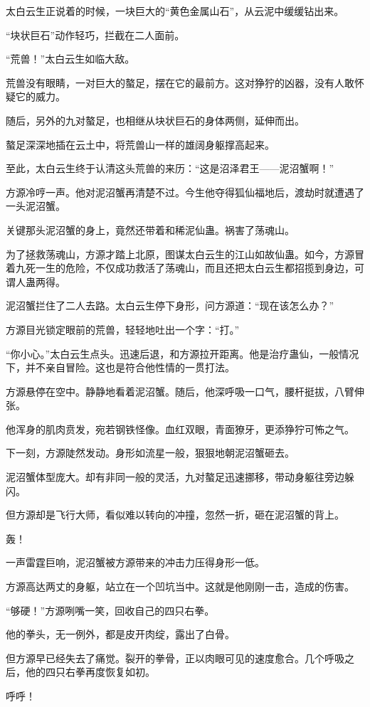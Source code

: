 \begin{this_body}
太白云生正说着的时候，一块巨大的“黄色金属山石”，从云泥中缓缓钻出来。

“块状巨石”动作轻巧，拦截在二人面前。

“荒兽！”太白云生如临大敌。

荒兽没有眼睛，一对巨大的螯足，摆在它的最前方。这对狰狞的凶器，没有人敢怀疑它的威力。

随后，另外的九对螯足，也相继从块状巨石的身体两侧，延伸而出。

螯足深深地插在云土中，将荒兽山一样的雄阔身躯撑高起来。

至此，太白云生终于认清这头荒兽的来历：“这是沼泽君王——泥沼蟹啊！”

方源冷哼一声。他对泥沼蟹再清楚不过。今生他夺得狐仙福地后，渡劫时就遭遇了一头泥沼蟹。

关键那头泥沼蟹的身上，竟然还带着和稀泥仙蛊。祸害了荡魂山。

为了拯救荡魂山，方源才踏上北原，图谋太白云生的江山如故仙蛊。如今，方源冒着九死一生的危险，不仅成功救活了荡魂山，而且还把太白云生都招揽到身边，可谓人蛊两得。

泥沼蟹拦住了二人去路。太白云生停下身形，问方源道：“现在该怎么办？”

方源目光锁定眼前的荒兽，轻轻地吐出一个字：“打。”

“你小心。”太白云生点头。迅速后退，和方源拉开距离。他是治疗蛊仙，一般情况下，并不亲自冒险。这也是符合他性情的一贯打法。

方源悬停在空中。静静地看着泥沼蟹。随后，他深呼吸一口气，腰杆挺拔，八臂伸张。

他浑身的肌肉贲发，宛若钢铁怪像。血红双眼，青面獠牙，更添狰狞可怖之气。

下一刻，方源陡然发动。身形如流星一般，狠狠地朝泥沼蟹砸去。

泥沼蟹体型庞大。却有非同一般的灵活，九对螯足迅速挪移，带动身躯往旁边躲闪。

但方源却是飞行大师，看似难以转向的冲撞，忽然一折，砸在泥沼蟹的背上。

轰！

一声雷霆巨响，泥沼蟹被方源带来的冲击力压得身形一低。

方源高达两丈的身躯，站立在一个凹坑当中。这就是他刚刚一击，造成的伤害。

“够硬！”方源咧嘴一笑，回收自己的四只右拳。

他的拳头，无一例外，都是皮开肉绽，露出了白骨。

但方源早已经失去了痛觉。裂开的拳骨，正以肉眼可见的速度愈合。几个呼吸之后，他的四只右拳再度恢复如初。

呼呼！


\end{this_body}
